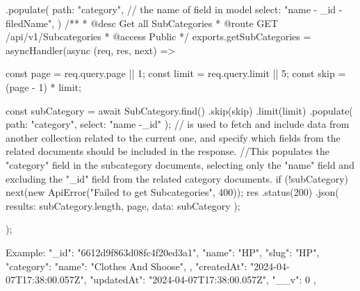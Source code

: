  .populate({
    path: "category", // the name of field in model
    select: "name - _id - filedName",   
  })
                                     /**
                                            * @desc     Get all SubCategories
                                            * @route    GET /api/v1/Subcategories
                                            * @access   Public
                                            */
                                            exports.getSubCategories = asyncHandler(async (req, res, next) => {
                                            const page = req.query.page || 1;
                                            const limit = req.query.limit || 5;
                                            const skip = (page - 1) * limit;

                                            const subCategory = await SubCategory.find({})
                                                .skip(skip)
                                                .limit(limit)
                                                .populate({ path: "category", select: "name -_id" });
                                            // is used to fetch and include data from another collection related to the current one, and specify which fields from the related documents should be included in the response.
                                            //This populates the "category" field in the subcategory documents, selecting only the "name" field and excluding the "_id" field from the related category documents.
                                            if (!subCategory) {
                                                next(new ApiError("Failed to get Subcategories", 400));
                                            }
                                            res
                                                .status(200)
                                                .json({ results: subCategory.length, page, data: subCategory });
                                            });

                                            Example: {
                                                        "_id": "6612d9f863d08fc4f20ed3a1",
                                                        "name": "HP",
                                                        "slug": "HP",
                                                        "category": {
                                                            "name": "Clothes And Shoose",
                                                        },
                                                        "createdAt": "2024-04-07T17:38:00.057Z",
                                                        "updatedAt": "2024-04-07T17:38:00.057Z",
                                                        "__v": 0
                                                    },




